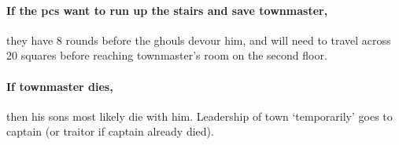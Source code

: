 \paragraph{If the \glspl{pc} want to run up the stairs and save \gls{townmaster},}
they have 8 rounds before the ghouls devour him, and will need to travel across 20 squares before reaching \gls{townmaster}'s room on the second floor.

\paragraph{If \gls{townmaster} dies,}
then his sons most likely die with him.
Leadership of \gls{town} `temporarily' goes to \Gls{captain} (or \gls{traitor} if \gls{captain} already died).

\stopcontents[sq]
